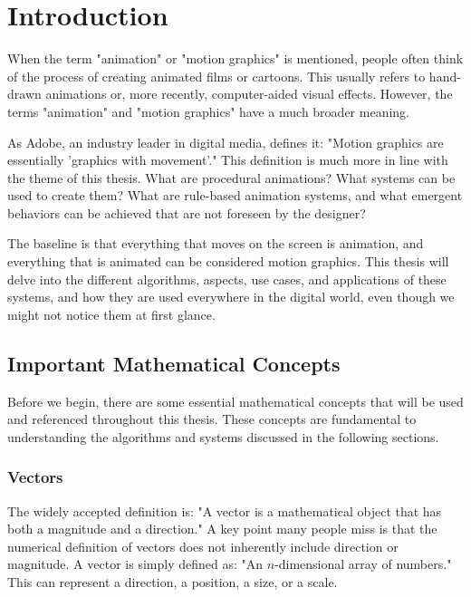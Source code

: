 \section{Introduction}
\label{sec:intro}

When the term "animation" or "motion graphics" is mentioned, people often think of the process of creating animated films or cartoons. This usually refers to hand-drawn animations or, more recently, computer-aided visual effects. However, the terms "animation" and "motion graphics" have a much broader meaning.

As Adobe, an industry leader in digital media, defines it: "Motion graphics are essentially 'graphics with movement'." \cite{adobe-motion-graphics} This definition is much more in line with the theme of this thesis. What are procedural animations? What systems can be used to create them? What are rule-based animation systems, and what emergent behaviors can be achieved that are not foreseen by the designer? 

The baseline is that everything that moves on the screen is animation, and everything that is animated can be considered motion graphics. This thesis will delve into the different algorithms, aspects, use cases, and applications of these systems, and how they are used everywhere in the digital world, even though we might not notice them at first glance.

\subsection{Important Mathematical Concepts}
\label{sec:important-mathematical-concepts}

Before we begin, there are some essential mathematical concepts that will be used and referenced throughout this thesis. These concepts are fundamental to understanding the algorithms and systems discussed in the following sections.

\subsubsection{Vectors}
\label{sec:vectors}

The widely accepted definition is: "A vector is a mathematical object that has both a magnitude and a direction." A key point many people miss is that the numerical definition of vectors does not inherently include direction or magnitude. A vector is simply defined as: "An \(n\)-dimensional array of numbers." This can represent a direction, a position, a size, or a scale.

